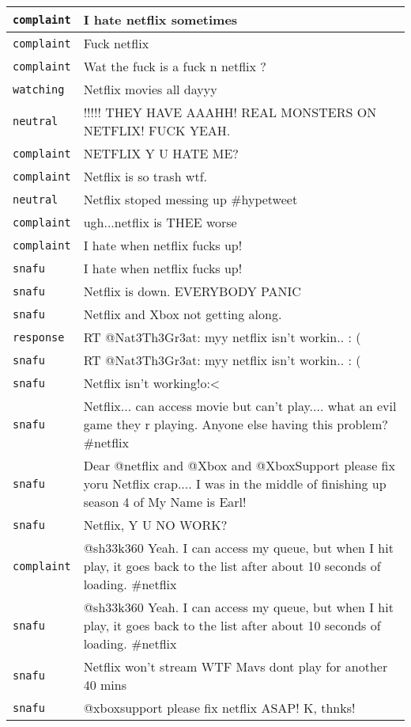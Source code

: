 {
   \setlength{\LTleft}{-20cm plus -1fill}
   \setlength{\LTright}{\LTleft}
   \footnotesize
   \begin{longtable}{|l|p{160mm}|}
      \hline
         \texttt{complaint} & I hate netflix sometimes
      \tabularnewline\hline
         \texttt{complaint} & Fuck netflix
      \tabularnewline\hline
         \texttt{complaint} & Wat the fuck is a fuck n netflix ?
      \tabularnewline\hline
         \texttt{watching} & Netflix movies all dayyy
      \tabularnewline\hline
         \texttt{neutral} & !!!!! THEY HAVE AAAHH! REAL MONSTERS ON NETFLIX! FUCK YEAH.
      \tabularnewline\hline
         \texttt{complaint} & NETFLIX Y U HATE ME?
      \tabularnewline\hline
         \texttt{complaint} & Netflix is so trash wtf.
      \tabularnewline\hline
         \texttt{neutral} & Netflix stoped messing up \#hypetweet
      \tabularnewline\hline
         \texttt{complaint} & ugh...netflix is THEE worse
      \tabularnewline\hline
         \texttt{complaint} & I hate when netflix fucks up!
      \tabularnewline\hline
         \texttt{snafu} & I hate when netflix fucks up!
      \tabularnewline\hline
         \texttt{snafu} & Netflix is down. EVERYBODY PANIC
      \tabularnewline\hline
         \texttt{snafu} & Netflix and Xbox not getting along.
      \tabularnewline\hline
         \texttt{response} & RT @Nat3Th3Gr3at: myy netflix isn't workin.. : (
      \tabularnewline\hline
         \texttt{snafu} & RT @Nat3Th3Gr3at: myy netflix isn't workin.. : (
      \tabularnewline\hline
         \texttt{snafu} & Netflix isn't working!o:<
      \tabularnewline\hline
         \texttt{snafu} & Netflix... can access movie but can't play.... what an evil game they r playing. Anyone else having this problem? \#netflix
      \tabularnewline\hline
         \texttt{snafu} & Dear @netflix and @Xbox and @XboxSupport please fix yoru Netflix crap.... I was in the middle of finishing up season 4 of My Name is Earl!
      \tabularnewline\hline
         \texttt{snafu} & Netflix, Y U NO WORK?
      \tabularnewline\hline
         \texttt{complaint} & @sh33k360 Yeah. I can access my queue, but when I hit play, it goes back to the list after about 10 seconds of loading. \#netflix
      \tabularnewline\hline
         \texttt{snafu} & @sh33k360 Yeah. I can access my queue, but when I hit play, it goes back to the list after about 10 seconds of loading. \#netflix
      \tabularnewline\hline
         \texttt{snafu} & Netflix won't stream WTF Mavs dont play for another 40 mins
      \tabularnewline\hline
         \texttt{snafu} & @xboxsupport please fix netflix ASAP! K, thnks!

\end{longtable}}
